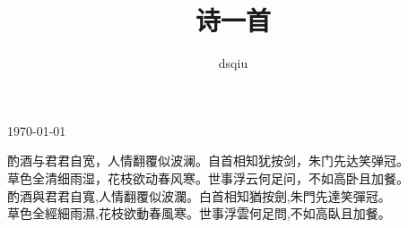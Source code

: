 \documentclass[24pt,a4paper]{article}
\begin{document}
\author{dsqiu}
\title{诗一首}
\today
\begin{CJK}{UTF8}{gkai}
酌酒与君君自宽，人情翻覆似波澜。自首相知犹按剑，朱门先达笑弹冠。\\
草色全清细雨湿，花枝欲动春风寒。世事浮云何足问，不如高卧且加餐。\\
酌酒與君君自寬,人情翻覆似波瀾。白首相知猶按劍,朱門先達笑彈冠。 \\
草色全經細雨濕,花枝欲動春風寒。世事浮雲何足問,不如高臥且加餐。
\end{CJK}
\end{document}
